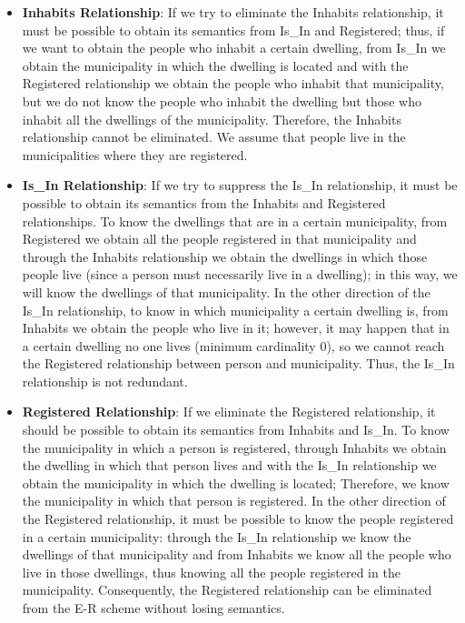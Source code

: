 \documentclass{article}
\begin{document}
\begin{itemize}
    \item \textbf{Inhabits Relationship}: If we try to eliminate the Inhabits relationship, it must be possible to obtain its semantics from Is\_In and Registered; thus, if we want to obtain the people who inhabit a certain dwelling, from Is\_In we obtain the municipality in which the dwelling is located and with the Registered relationship we obtain the people who inhabit that municipality, but we do not know the people who inhabit the dwelling but those who inhabit all the dwellings of the municipality.  Therefore, the Inhabits relationship cannot be eliminated.  We assume that people live in the municipalities where they are registered.

    \item \textbf{Is\_In Relationship}: If we try to suppress the Is\_In relationship, it must be possible to obtain its semantics from the Inhabits and Registered relationships.  To know the dwellings that are in a certain municipality, from Registered we obtain all the people registered in that municipality and through the Inhabits relationship we obtain the dwellings in which those people live (since a person must necessarily live in a dwelling); in this way, we will know the dwellings of that municipality.  In the other direction of the Is\_In relationship, to know in which municipality a certain dwelling is, from Inhabits we obtain the people who live in it; however, it may happen that in a certain dwelling no one lives (minimum cardinality 0), so we cannot reach the Registered relationship between person and municipality.  Thus, the Is\_In relationship is not redundant.

    \item \textbf{Registered Relationship}: If we eliminate the Registered relationship, it should be possible to obtain its semantics from Inhabits and Is\_In.  To know the municipality in which a person is registered, through Inhabits we obtain the dwelling in which that person lives and with the Is\_In relationship we obtain the municipality in which the dwelling is located; Therefore, we know the municipality in which that person is registered.  In the other direction of the Registered relationship, it must be possible to know the people registered in a certain municipality: through the Is\_In relationship we know the dwellings of that municipality and from Inhabits we know all the people who live in those dwellings, thus knowing all the people registered in the municipality.  Consequently, the Registered relationship can be eliminated from the E-R scheme without losing semantics.
\end{itemize}
\end{document}
